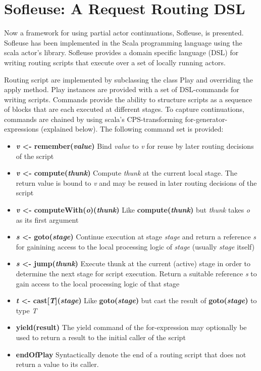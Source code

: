 \documentclass{sig-alternate}
\begin{document}
                         



\section{Sofleuse: A Request Routing DSL}

Now a framework for using partial actor continuations, Sofleuse, is presented. Sofleuse has been
implemented in the Scala programming language using the scala actor's library. Sofleuse provides a
domain specific language (DSL) for writing routing scripts that execute over a set of locally
running actors.

Routing script are implemented by subclassing the class Play and overriding the apply method. Play
instances are provided with a set of DSL-commands for writing scripts. Commands provide the ability
to structure scripts as a sequence of blocks that are each executed at different stages. To capture
continuations, commands are chained by using scala's CPS-transforming for-generator-expressions
(explained below). The following command set is provided:


\begin{itemize}                                   
	\item \textbf{\emph{v} <- remember(\emph{value})} Bind \emph{value} to \emph{v} for reuse by
	later routing decisions of the script
	\item \textbf{\emph{v} <- compute(\emph{thunk})} Compute \emph{thunk} at the current local stage.  
	The return value is bound to \emph{v} and may be reused in later routing decisions of the script
	\item \textbf{\emph{v} <- computeWith(\emph{o})(\emph{thunk})} Like \textbf{compute(\emph{thunk})} 
	but \emph{thunk} takes \emph{o} as its first argument
	\item \textbf{\emph{s} <- goto(\emph{stage})} Continue execution at stage \emph{stage} and 
	return a reference \emph{s} for gainining access to the local processing logic of \emph{stage} 
	(usually \emph{stage} itself)
	\item \textbf{\emph{s} <- jump(\emph{thunk})} Execute thunk at the current (active) stage in 
	order to determine the next stage for script execution.	Return a suitable reference \emph{s} to 
	gain access to the local processing logic of that stage
	\item \textbf{\emph{t} <- cast[\emph{T}](\emph{stage})} Like \textbf{goto(\emph{stage})} but 
	cast the result of \textbf{goto(\emph{stage})} to type \emph{T}   
	\item \textbf{yield(result)} The yield command of the for-expression may optionally be used to 
	return a result to the initial caller of the script                           	
	\item \textbf{endOfPlay} Syntactically denote the end of a routing script that does not return
	 a value to its caller.
\end{itemize}                                                                                                  
                                                                            
\end{document}
